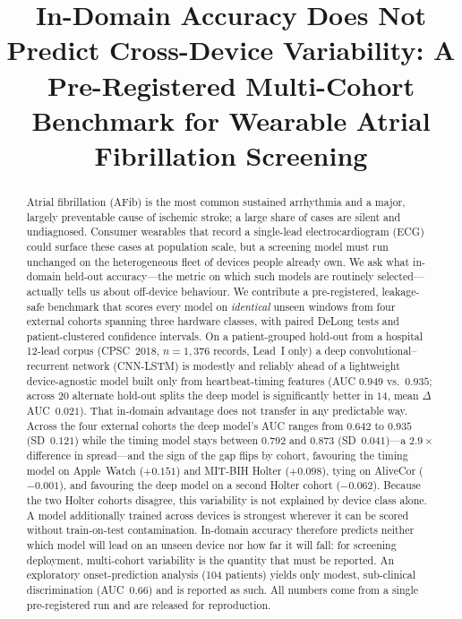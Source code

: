\documentclass[]{ws-procs9x6}
\begin{document}
\title{In-Domain Accuracy Does Not Predict Cross-Device Variability:
A Pre-Registered Multi-Cohort Benchmark for Wearable Atrial Fibrillation Screening}

\begin{abstract}
Atrial fibrillation (AFib) is the most common sustained arrhythmia and a major,
largely preventable cause of ischemic stroke; a large share of cases are silent
and undiagnosed. Consumer wearables that record a single-lead electrocardiogram
(ECG) could surface these cases at population scale, but a screening model must
run unchanged on the heterogeneous fleet of devices people already own. We ask
what in-domain held-out accuracy---the metric on which such models are routinely
selected---actually tells us about off-device behaviour. We contribute a
pre-registered, leakage-safe benchmark that scores every model on \emph{identical}
unseen windows from four external cohorts spanning three hardware classes, with
paired DeLong tests and patient-clustered confidence intervals. On a
patient-grouped hold-out from a hospital 12-lead corpus (CPSC~2018, $n{=}1{,}376$
records, Lead~I only) a deep convolutional--recurrent network (CNN-LSTM) is
modestly and reliably ahead of a lightweight device-agnostic model built only
from heartbeat-timing features (AUC $0.949$ vs.\ $0.935$; across $20$ alternate
hold-out splits the deep model is significantly better in $14$, mean
$\Delta$AUC~$0.021$). That in-domain advantage does not transfer in any
predictable way. Across the four external cohorts the deep model's AUC ranges
from $0.642$ to $0.935$ (SD~$0.121$) while the timing model stays between $0.792$
and $0.873$ (SD~$0.041$)---a $2.9\times$ difference in spread---and the sign of
the gap flips by cohort, favouring the timing model on Apple~Watch ($+0.151$) and
MIT-BIH Holter ($+0.098$), tying on AliveCor ($-0.001$), and favouring the deep
model on a second Holter cohort ($-0.062$). Because the two Holter cohorts
disagree, this variability is not explained by device class alone. A model
additionally trained across devices is strongest wherever it can be scored
without train-on-test contamination. In-domain accuracy therefore predicts
neither which model will lead on an unseen device nor how far it will fall: for
screening deployment, multi-cohort variability is the quantity that must be
reported. An exploratory onset-prediction analysis (104 patients) yields only
modest, sub-clinical discrimination (AUC~$0.66$) and is reported as such. All
numbers come from a single pre-registered run and are released for reproduction.
\end{abstract}
\end{document}
